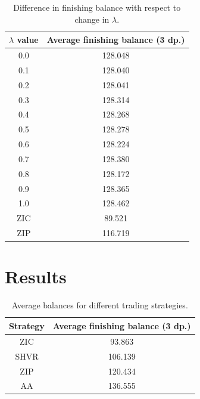 \documentclass[preprint]{acm_proc_article-sp} %
\begin{document}
\begin{table}[h]
  \centering
  \label{tbl:lambda_results2}
  \begin{tabular}{ | c | c | }
    \hline
    \textbf{$\lambda$ value} & \textbf{Average finishing balance (3 dp.)} \\
    \hline
        0.0 & 128.048 \\
        0.1 & 128.040 \\
        0.2 & 128.041 \\
        0.3 & 128.314 \\
        0.4 & 128.268 \\
        0.5 & 128.278 \\
        0.6 & 128.224 \\
        0.7 & 128.380 \\
        0.8 & 128.172 \\
        0.9 & 128.365 \\
        1.0 & 128.462 \\
    \hline \hline
        ZIC &  89.521 \\
        ZIP & 116.719 \\
    \hline
  \end{tabular}
  \caption{Difference in finishing balance with respect to change in $\lambda$.}
\end{table}


\section{Results} \label{sec:results}

\begin{table}[h]
  \centering
  \label{tbl:results}
  \begin{tabular}{ | c | c | }
    \hline
    Strategy & Average finishing balance (3 dp.) \\
    \hline
    ZIC & 93.863 \\
    SHVR & 106.139 \\
    ZIP & 120.434 \\
    AA & 136.555 \\
    \hline
  \end{tabular}
  \caption{Average balances for different trading strategies.}
\end{table}
\end{document}

